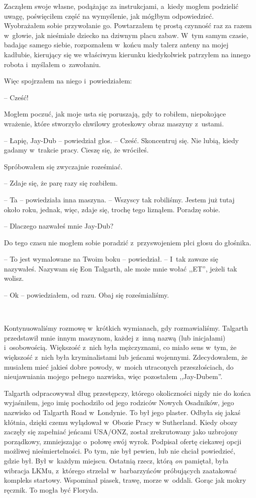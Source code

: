 \documentclass[oneside,polish,11pt,sfheadings]{mwbk}
\let\footnote=\endnote
\begin{document}
Zacząłem swoje własne, podążając za instrukcjami, a~kiedy mogłem
podzielić uwagę, poświęciłem część na wymyślenie, jak mógłbym
odpowiedzieć. Wyobrażałem sobie przywołanie go. Powtarzałem tę prostą
czynność raz za razem w~głowie, jak nieśmiałe dziecko na dziwnym placu
zabaw. W~tym samym czasie, badając samego siebie, rozpoznałem w~końcu
mały talerz anteny na mojej kadłubie, kierujący się we właściwym kierunku
kiedykolwiek patrzyłem na innego robota i~myślałem o~zawołaniu.

Więc spojrzałem na niego i~powiedziałem: 

-- Cześć! 

Mogłem poczuć, jak moje usta się poruszają, gdy to robiłem, niepokojące wrażenie, które
stworzyło chwilowy groteskowy obraz maszyny z~ustami.

-- Łapię, Jay-Dub -- powiedział głos. -- Cześć. Skoncentruj się. Nie lubią,
kiedy gadamy w~trakcie pracy. Cieszę się, że wróciłeś.

Spróbowałem się zwyczajnie roześmiać.

-- Zdaje się, że parę razy się rozbiłem.

-- Ta -- powiedziała inna maszyna. -- Wszyscy tak robiliśmy. Jestem już
tutaj około roku, jednak, więc, zdaje się, trochę tego liznąłem. Poradzę
sobie.

-- Dlaczego nazwałeś mnie Jay-Dub?

Do tego czasu nie mogłem sobie poradzić z~przyswojeniem płci głosu do
głośnika. 

-- To jest wymalowane na Twoim boku -- powiedział. -- I~tak
zawsze się nazywałeś. Nazywam się Eon Talgarth, ale może mnie wołać
,,ET'', jeżeli tak wolisz.

-- Ok -- powiedziałem, od razu. Obaj się roześmialiśmy.

~

Kontynuowaliśmy rozmowę w~krótkich wymianach, gdy rozmawialiśmy.
Talgarth przedstawił mnie innym maszynom, każdej z~inną nazwą (lub
inicjałami) i~osobowością. Większość z~nich była mężczyznami, co miało
sens w~tym, że większość z~nich była kryminalistami lub jeńcami
wojennymi. Zdecydowałem, że musiałem mieć jakieś dobre powody, w~moich
utraconych przeszłościach, do nieujawniania mojego pełnego nazwiska,
więc pozostałem ,,Jay-Dubem''.

Talgarth odpracowywał dług przestępczy, którego okoliczności nigdy nie
do końca wyjaśniłem, jego imię pochodziło od jego rodziców Nowych
Osadników, jego nazwisko od Talgarth Road w~Londynie. To był jego
plaster. Odbyła się jakaś kłótnia, dzięki czemu wylądował w~Obozie Pracy
w Sutherland. Kiedy obozy zaczęły się zapełniać jeńcami USA/ONZ, został
zrekrutowany jako uzbrojony porządkowy, zmniejszając o~połowę swój
wyrok. Podpisał ofertę ciekawej opcji możliwej nieśmiertelności. Po tym,
nie był pewien, lub nie chciał powiedzieć, gdzie był. Był w~każdym
miejscu. Ostatnią rzecz, którą \emph{on} pamiętał, była wibracja
LKMu\footnote{ LKM -- lekki karabin maszynowym  -- przyp.tłum.}, z~którego
strzelał w~barbarzyńców próbujących zaatakować kompleks startowy.
Wspominał piasek, trawę, morze w~oddali. Gorąc jak mokry ręcznik. To
mogła być Floryda.
\end{document}

